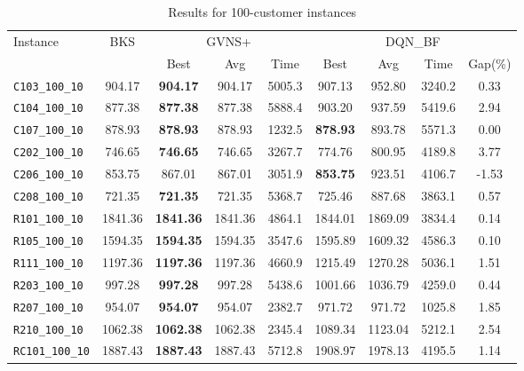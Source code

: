 \begin{table}[ht]
\centering
\small
\setlength{\tabcolsep}{5pt}
\caption{Results for 100-customer instances}
\vspace{4mm}
\begin{adjustbox}{width=\textwidth}
\begin{tabular}{l c c c c @{\hspace{8pt}} c c c c @{\hspace{8pt}}}
\toprule
\multirow{2}{*}{Instance} & \multirow{2}{*}{BKS} & \multicolumn{3}{c}{GVNS+} & \multicolumn{4}{c}{DQN\_BF} \\
\cmidrule(lr){3-5} \cmidrule(lr){6-9}
 &  & Best & Avg & Time & Best & Avg & Time & Gap(\%) \\
\midrule
\texttt{C103\_100\_10} & 904.17 & \textbf{904.17} & 904.17 & 5005.3 & 907.13 & 952.80 & 3240.2 & 0.33 \\
\texttt{C104\_100\_10} & 877.38 & \textbf{877.38} & 877.38 & 5888.4 & 903.20 & 937.59 & 5419.6 & 2.94 \\
\texttt{C107\_100\_10} & 878.93 & \textbf{878.93} & 878.93 & 1232.5 & \textbf{878.93} & 893.78 & 5571.3 & 0.00 \\
\texttt{C202\_100\_10} & 746.65 & \textbf{746.65} & 746.65 & 3267.7 & 774.76 & 800.95 & 4189.8 & 3.77 \\
\texttt{C206\_100\_10} & 853.75 & 867.01 & 867.01 & 3051.9 & \textbf{853.75} & 923.51 & 4106.7 & -1.53 \\
\texttt{C208\_100\_10} & 721.35 & \textbf{721.35} & 721.35 & 5368.7 & 725.46 & 887.68 & 3863.1 & 0.57 \\
\texttt{R101\_100\_10} & 1841.36 & \textbf{1841.36} & 1841.36 & 4864.1 & 1844.01 & 1869.09 & 3834.4 & 0.14 \\
\texttt{R105\_100\_10} & 1594.35 & \textbf{1594.35} & 1594.35 & 3547.6 & 1595.89 & 1609.32 & 4586.3 & 0.10 \\
\texttt{R111\_100\_10} & 1197.36 & \textbf{1197.36} & 1197.36 & 4660.9 & 1215.49 & 1270.28 & 5036.1 & 1.51 \\
\texttt{R203\_100\_10} & 997.28 & \textbf{997.28} & 997.28 & 5438.6 & 1001.66 & 1036.79 & 4259.0 & 0.44 \\
\texttt{R207\_100\_10} & 954.07 & \textbf{954.07} & 954.07 & 2382.7 & 971.72 & 971.72 & 1025.8 & 1.85 \\
\texttt{R210\_100\_10} & 1062.38 & \textbf{1062.38} & 1062.38 & 2345.4 & 1089.34 & 1123.04 & 5212.1 & 2.54 \\
\texttt{RC101\_100\_10} & 1887.43 & \textbf{1887.43} & 1887.43 & 5712.8 & 1908.97 & 1978.13 & 4195.5 & 1.14 \\

\end{tabular}
\end{adjustbox}
\end{table}
